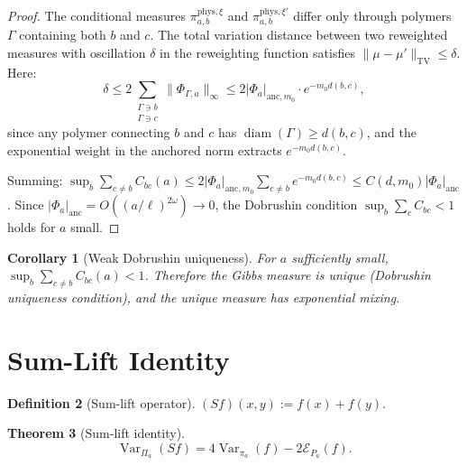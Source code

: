 \documentclass[12pt]{article}
\theoremstyle{plain}
\newtheorem{theorem}{Theorem}[section]
\newtheorem{corollary}[theorem]{Corollary}
\theoremstyle{definition}
\newtheorem{definition}[theorem]{Definition}
\numberwithin{equation}{section}
\newcommand{\Var}{\operatorname{Var}}
\newcommand{\diam}{\operatorname{diam}}
\newcommand{\phys}{\mathrm{phys}}
\begin{document}
\begin{proof}
The conditional measures $\pi_{a,b}^{\phys,\xi}$ and $\pi_{a,b}^{\phys,\xi'}$ differ only through polymers $\Gamma$ containing both $b$ and $c$.  The total variation distance between two reweighted measures with oscillation $\delta$ in the reweighting function satisfies $\|\mu-\mu'\|_{\mathrm{TV}}\leq\delta$.  Here:
\begin{equation}
\delta \leq 2\sum_{\substack{\Gamma\ni b\\\Gamma\ni c}}\|\Phi_{\Gamma,a}\|_\infty \leq 2|\Phi_a|_{\mathrm{anc},m_0}\cdot e^{-m_0 d(b,c)},
\end{equation}
since any polymer connecting $b$ and $c$ has $\diam(\Gamma)\geq d(b,c)$, and the exponential weight in the anchored norm extracts $e^{-m_0 d(b,c)}$.

Summing: $\sup_b\sum_{c\neq b}C_{bc}(a)\leq 2|\Phi_a|_{\mathrm{anc},m_0}\sum_{c\neq b}e^{-m_0 d(b,c)}\leq C(d,m_0)|\Phi_a|_{\mathrm{anc}}$.  Since $|\Phi_a|_{\mathrm{anc}}=O((a/\ell)^{2\omega})\to 0$, the Dobrushin condition $\sup_b\sum_c C_{bc}<1$ holds for $a$ small.
\end{proof}

\begin{corollary}[Weak Dobrushin uniqueness]\label{cor:dobrushin}
For $a$ sufficiently small, $\sup_b\sum_{c\neq b}C_{bc}(a)<1$.  Therefore the Gibbs measure is unique (Dobrushin uniqueness condition), and the unique measure has exponential mixing.
\end{corollary}

\section{Sum-Lift Identity}\label{sec:sumlift}

\begin{definition}[Sum-lift operator]
$(Sf)(x,y):=f(x)+f(y)$.
\end{definition}

\begin{theorem}[Sum-lift identity]\label{thm:sumlift}
\begin{equation}
\boxed{\Var_{\Pi_a}(Sf) = 4\Var_{\pi_a}(f) - 2\mathcal{E}_{P_a}(f).}
\end{equation}
\end{theorem}
\end{document}
